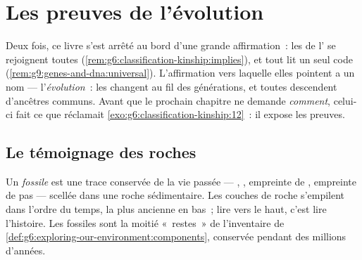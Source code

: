 \chapter{Les preuves de l'évolution}\label{ch:g9:evidence-of-evolution}

Deux fois, ce livre s'est arrêté au bord d'une grande
affirmation~: les  de l' se
rejoignent toutes
(\cref{rem:g6:classification-kinship:implies}), et tout  lit un seul code
(\cref{rem:g9:genes-and-dna:universal}). L'affirmation vers
laquelle elles pointent a un nom --- l'\emph{évolution}~:
les  changent au fil des générations, et toutes
descendent d'ancêtres communs. Avant que le prochain
chapitre ne demande \emph{comment}, celui-ci fait ce que
réclamait \cref{exo:g6:classification-kinship:12}~: il
expose les preuves.

\section{Le témoignage des roches}

\begin{definition}\label{def:g9:evidence-of-evolution:fossils}
Un \emph{fossile} est une trace conservée de
la vie passée --- , , empreinte de ,
empreinte de pas --- scellée dans une roche sédimentaire.
Les couches de roche s'empilent dans l'ordre du temps, la
plus ancienne en bas~; lire vers le haut, c'est lire
l'histoire. Les fossiles sont la moitié «~restes~» de
l'inventaire de
\cref{def:g6:exploring-our-environment:components},
conservée pendant des millions d'années.
\end{definition}

